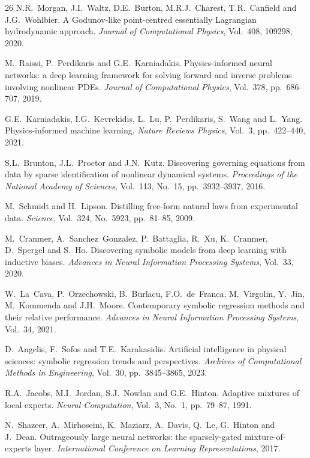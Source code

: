 \documentclass{WCCM-ECCOMAS_2026_Full_Paper}
\begin{document}
\begin{thebibliography}{26}
N.R.~Morgan, J.I.~Waltz, D.E.~Burton, M.R.J.~Charest,
T.R.~Canfield and J.G.~Wohlbier.
A Godunov-like point-centred essentially Lagrangian hydrodynamic
approach.
\textit{Journal of Computational Physics}, Vol.~408, 109298, 2020.

M.~Raissi, P.~Perdikaris and G.E.~Karniadakis.
Physics-informed neural networks: a deep learning framework for
solving forward and inverse problems involving nonlinear PDEs.
\textit{Journal of Computational Physics}, Vol.~378, pp.~686--707, 2019.

G.E.~Karniadakis, I.G.~Kevrekidis, L.~Lu, P.~Perdikaris, S.~Wang
and L.~Yang.
Physics-informed machine learning.
\textit{Nature Reviews Physics}, Vol.~3, pp.~422--440, 2021.

S.L.~Brunton, J.L.~Proctor and J.N.~Kutz.
Discovering governing equations from data by sparse identification
of nonlinear dynamical systems.
\textit{Proceedings of the National Academy of Sciences},
Vol.~113, No.~15, pp.~3932--3937, 2016.

M.~Schmidt and H.~Lipson.
Distilling free-form natural laws from experimental data.
\textit{Science}, Vol.~324, No.~5923, pp.~81--85, 2009.

M.~Cranmer, A.~Sanchez~Gonzalez, P.~Battaglia, R.~Xu, K.~Cranmer,
D.~Spergel and S.~Ho.
Discovering symbolic models from deep learning with inductive biases.
\textit{Advances in Neural Information Processing Systems},
Vol.~33, 2020.

W.~La~Cava, P.~Orzechowski, B.~Burlacu, F.O.~de~Franca,
M.~Virgolin, Y.~Jin, M.~Kommenda and J.H.~Moore.
Contemporary symbolic regression methods and their relative
performance.
\textit{Advances in Neural Information Processing Systems},
Vol.~34, 2021.

D.~Angelis, F.~Sofos and T.E.~Karakasidis.
Artificial intelligence in physical sciences: symbolic regression
trends and perspectives.
\textit{Archives of Computational Methods in Engineering},
Vol.~30, pp.~3845--3865, 2023.

R.A.~Jacobs, M.I.~Jordan, S.J.~Nowlan and G.E.~Hinton.
Adaptive mixtures of local experts.
\textit{Neural Computation}, Vol.~3, No.~1, pp.~79--87, 1991.

N.~Shazeer, A.~Mirhoseini, K.~Maziarz, A.~Davis, Q.~Le,
G.~Hinton and J.~Dean.
Outrageously large neural networks: the sparsely-gated
mixture-of-experts layer.
\textit{International Conference on Learning Representations}, 2017.


\end{thebibliography}
\end{document}
